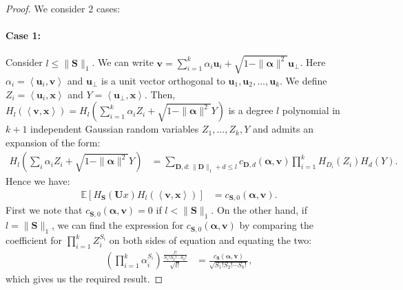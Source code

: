 \documentclass[final,12pt]{colt2018} %
\newcommand{\E}{\mathbb{E}}
\renewcommand\v[1]{{\ensuremath{\boldsymbol{#1}}}}
\newcommand\ip[1]{\left\langle #1 \right\rangle}
\begin{document}
\begin{proof}
We consider 2 cases:
\paragraph{Case 1:} Consider $l \leq \|\v S\|_1$. We can write $\v v = \sum_{i=1}^k \alpha_i \v u_i + \sqrt{1 -\| \v \alpha \|^2} \v u_\perp$. Here $\alpha_i = \ip{\v u_i, \v v}$ and $\v u_\perp$ is a unit vector orthogonal to $\v u_1, \v u_2, \dotsc, \v u_k$. We define $Z_i = \ip{\v u_i, \v x}$ and $Y = \ip{ \v u_\perp, \v x}$. Then, $H_l(\ip{\v v, \v x}) = H_l(\sum_{i=1}^k \alpha_i Z_i + \sqrt{1 -\| \v \alpha \|^2} Y)$ is a degree $l$ polynomial in $k+1$ independent Gaussian random variables $Z_1, \dotsc, Z_k, Y$ and admits an expansion of the form: 
\begin{align} \label{eq: expansion eq mim}
   H_l\left(\sum_{i} \alpha_i Z_i + \sqrt{1 -\| \v \alpha \|^2} Y\right) & = \sum_{\v D,d: \|\v D\|_1 + d \leq l} c_{\v D,d}(\v \alpha, \v v) \prod_{i=1}^k H_{D_i}(Z_i) H_{d}(Y).
\end{align}
Hence we have: 
\begin{align*}
    \E \left[H_{\v S}(\v U x) H_l(\ip{\v v, \v x}) \right] &= c_{\v S,0}(\v \alpha, \v v).
\end{align*}
First we note that $c_{\v S,0}(\v \alpha, \v v) = 0$ if $l<\|\v S\|_1$. On the other hand, if $l = \|\v S\|_1$, we can find the expression for $c_{\v S, 0}(\v \alpha, \v v)$ by comparing the coefficient for $\prod_{i=1}^k Z_i^{S_i}$ on both sides of equation  and equating the two: 
\begin{align*}
\left( \prod_{i=1}^k \alpha_i^{S_i} \right) \frac{\frac{l!}{S_1 ! S_2 ! \dotsb S_k !}}{\sqrt{l!}} & = \frac{c_{\v S}(\v \alpha, \v v)}{\sqrt{S_1 ! S_2 ! \dotsb S_k !}},
\end{align*}
which gives us the required result.

\end{proof}
\end{document}
